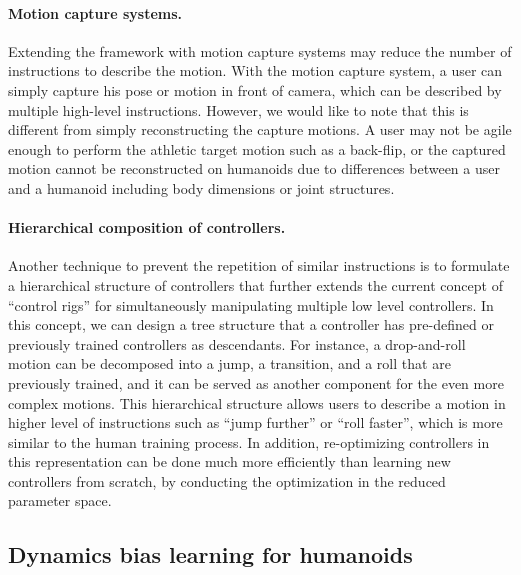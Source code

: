 \paragraph{Motion capture systems.}
Extending the framework with motion capture systems may reduce the number of
instructions to describe the motion.
With the motion capture system, a user can simply capture his pose or motion in
front of camera, which can be described by multiple high-level instructions.
However, we would like to note that this is different from simply
reconstructing the capture motions.
A user may not be agile enough to perform the athletic target motion 
such as a back-flip, or the captured motion cannot be reconstructed on 
humanoids due to differences between a user and a humanoid including body
dimensions or joint structures.

\paragraph{Hierarchical composition of controllers.}
Another technique to prevent the repetition of similar instructions is to
formulate a hierarchical structure of controllers that further extends the
current concept of ``control rigs'' for simultaneously manipulating multiple
low level controllers.
In this concept, we can design a tree structure that a controller has
pre-defined or previously trained controllers as descendants.
For instance, a drop-and-roll motion can be decomposed into a jump, a
transition, and a roll that are previously trained, and
it can be served as another component for the even more complex motions.
This hierarchical structure allows users to describe a motion in higher level
of instructions such as ``jump further'' or ``roll faster'', which is more
similar to the human training process. 
In addition, re-optimizing controllers in this representation can be done much
more efficiently than learning new controllers from scratch, by conducting the
optimization in the reduced parameter space.

\subsection{Dynamics bias learning for humanoids} 

